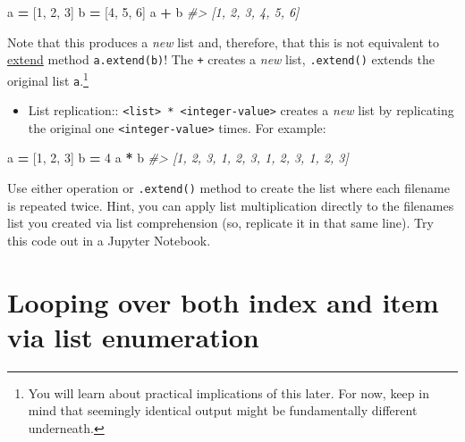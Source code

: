 \documentclass[
]{book}
\newenvironment{Shaded}{\begin{snugshade}}{\end{snugshade}}
\newcommand{\CommentTok}[1]{\textcolor[rgb]{0.56,0.35,0.01}{\textit{#1}}}
\newcommand{\DecValTok}[1]{\textcolor[rgb]{0.00,0.00,0.81}{#1}}
\newcommand{\NormalTok}[1]{#1}
\newcommand{\OperatorTok}[1]{\textcolor[rgb]{0.81,0.36,0.00}{\textbf{#1}}}
\providecommand{\tightlist}{%
  \setlength{\itemsep}{0pt}\setlength{\parskip}{0pt}}
\begin{document}
\begin{Shaded}
\begin{Highlighting}[]
\NormalTok{a }\OperatorTok{=}\NormalTok{ [}\DecValTok{1}\NormalTok{, }\DecValTok{2}\NormalTok{, }\DecValTok{3}\NormalTok{]}
\NormalTok{b }\OperatorTok{=}\NormalTok{ [}\DecValTok{4}\NormalTok{, }\DecValTok{5}\NormalTok{, }\DecValTok{6}\NormalTok{]}
\NormalTok{a }\OperatorTok{+}\NormalTok{ b}
\CommentTok{\#\textgreater{} [1, 2, 3, 4, 5, 6]}
\end{Highlighting}
\end{Shaded}

Note that this produces a \emph{new} list and, therefore, that this is not equivalent to \href{https://docs.python.org/3/tutorial/datastructures.html\#more-on-lists}{extend} method \texttt{a.extend(b)}! The \texttt{+} creates a \emph{new} list, \texttt{.extend()} extends the original list \texttt{a}.\footnote{You will learn about practical implications of this later. For now, keep in mind that seemingly identical output might be fundamentally different underneath.}

\begin{itemize}
\tightlist
\item
  List replication:: \texttt{\textless{}list\textgreater{}\ *\ \textless{}integer-value\textgreater{}} creates a \emph{new} list by replicating the original one \texttt{\textless{}integer-value\textgreater{}} times. For example:
\end{itemize}

\begin{Shaded}
\begin{Highlighting}[]
\NormalTok{a }\OperatorTok{=}\NormalTok{ [}\DecValTok{1}\NormalTok{, }\DecValTok{2}\NormalTok{, }\DecValTok{3}\NormalTok{]}
\NormalTok{b }\OperatorTok{=} \DecValTok{4}
\NormalTok{a }\OperatorTok{*}\NormalTok{ b}
\CommentTok{\#\textgreater{} [1, 2, 3, 1, 2, 3, 1, 2, 3, 1, 2, 3]}
\end{Highlighting}
\end{Shaded}

Use either operation or \texttt{.extend()} method to create the list where each filename is repeated twice. Hint, you can apply list multiplication directly to the filenames list you created via list comprehension (so, replicate it in that same line). Try this code out in a Jupyter Notebook.

\hypertarget{enumerate}{%
\section{Looping over both index and item via list enumeration}\label{enumerate}}
\end{document}
